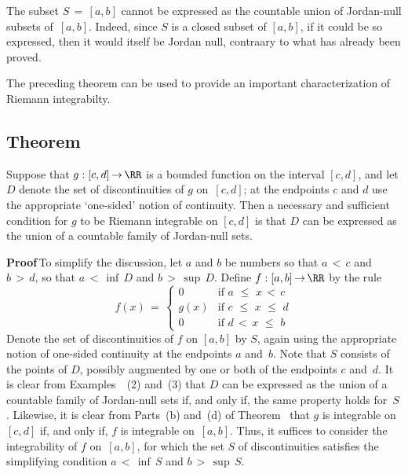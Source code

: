\V

\hspace*{\parindent} The subset $S \,=\, [a,b]$ cannot be expressed as the countable union of Jordan-null subsets of~$[a,b]$. Indeed, since $S$ is a closed subset of $[a,b]$,
    if it could be so expressed, then it would itself be Jordan null, contraary to what has already been proved.


\VV

        The preceding theorem can be used to provide an important characterization of Riemann integrabilty.

\V

        \subsection{\small{{\bf Theorem}}}
        \label{ThmH20.60}

\V

        Suppose that $g:[c,d]\,{\rightarrow}\,{\RR}$ is a bounded function on the interval $[c,d]$, and let $D$ denote the set of discontinuities of $g$ on~$[c,d]$;
    at the endpoints $c$ and $d$ use the appropriate `one-sided' notion of continuity. Then a necessary and sufficient condition for $g$ to be Riemann integrable on $[c,d]$
    is that $D$ can be expressed as the union of a countable family of Jordan-null sets.

\V

        {\bf Proof}\,To simplify the discussion, let $a$ and $b$ be numbers so that $a\,<\,c$ and $b\,>\,d$, so that $a\,<\,{\inf}\,D$ and $b\,>\,{\sup}\,D$.
    Define $f:[a,b] \,{\rightarrow}\, {\RR}$ by the rule
        \begin{displaymath}
        f(x) \,=\, \left\{
        \begin{array}{cl}
        0 & \mbox{if $a\,\,{\leq}\,\,x\,<\,c$} \\
        g(x) & \mbox{if $c\,\,{\leq}\,\,x\,\,{\leq}\,\,d$} \\
        0 & \mbox{if $d\,<\,x\,\,{\leq}\,\,b$}
        \end{array}
        \right.
        \end{displaymath}
    Denote the set of discontinuities of $f$ on $[a,b]$ by $S$, again using the appropriate notion of one-sided continuity at the endpoints $a$ and~$b$.
    Note that $S$ consists of the points of $D$, possibly augmented by one or both of the endpoints $c$ and~$d$.
    It is clear from Examples~~(2) and~(3) that $D$ can be expressed as the union
    of a countable family of Jordan-null sets if, and only if, the same property holds for~$S$.
    Likewise, it is clear from Parts~(b) and~(d) of Theorem~ that $g$ is integrable on $[c,d]$ if, and only if, $f$ is integrable on~$[a,b]$.
    Thus, it suffices to consider the integrability of $f$ on~$[a,b]$, for which the set $S$ of discontinuities
    satisfies the simplifying condition $a\,<\,{\inf}\,S$ and $b\,>\,{\sup}\,S$.

